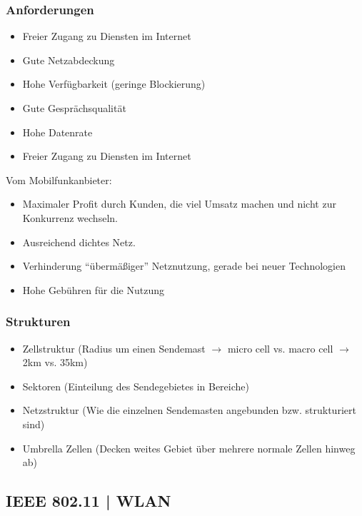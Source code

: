 \documentclass{article} %
\begin{document}
\subsubsection{Anforderungen}
	\begin{itemize}
	\item Freier Zugang zu Diensten im Internet
	\item Gute Netzabdeckung
	\item Hohe Verfügbarkeit (geringe Blockierung)
	\item Gute Gesprächsqualität
	\item Hohe Datenrate
	\item Freier Zugang zu Diensten im Internet
	\end{itemize}
Vom Mobilfunkanbieter:
	\begin{itemize}
	\item Maximaler Profit durch Kunden, die viel Umsatz machen und nicht zur Konkurrenz wechseln. 
	\item Ausreichend dichtes Netz. 
	\item Verhinderung "`übermäßiger"' Netznutzung, gerade bei neuer Technologien
	\item Hohe Gebühren für die Nutzung
	\end{itemize}
	
\subsubsection{Strukturen}
	\begin{itemize}
	\item Zellstruktur (Radius um einen Sendemast $\rightarrow$ micro cell vs. macro cell $\rightarrow$ 2km vs. 35km)
	\item Sektoren (Einteilung des Sendegebietes in Bereiche)
	\item Netzstruktur (Wie die einzelnen Sendemasten angebunden bzw. strukturiert sind)
	\item Umbrella Zellen (Decken weites Gebiet über mehrere normale Zellen hinweg ab)
	\end{itemize}

\subsection{IEEE 802.11 | WLAN}
\end{document}

